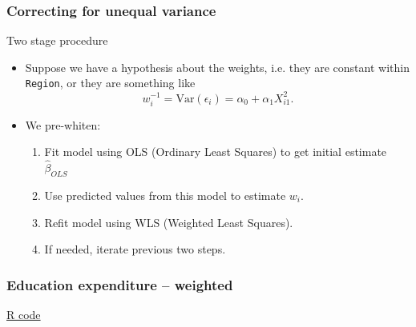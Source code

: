 \documentclass[handout]{beamer}
\begin{document}
   \begin{frame} \frametitle{Correcting for unequal variance}

   \begin{block}
   {Two stage procedure}

   \begin{itemize}


   \item Suppose we have a hypothesis about the weights, i.e.
   they are constant within {\tt Region}, or they are something like
   $$
   w_i^{-1} = \text{Var}(\epsilon_i) =  \alpha_0 + \alpha_1 X_{i1}^2.$$

   \item We pre-whiten:
   \begin{enumerate}
   \item Fit model using OLS (Ordinary Least Squares) to get initial estimate $\widehat{\beta}_{OLS}$

   \item Use predicted values from this model to estimate $w_i$.
   \item Refit model using WLS (Weighted Least Squares).

   \item If needed, iterate previous two steps.
   \end{enumerate}
   \end{itemize}
   \end{block}
   \end{frame}



   \begin{frame}
   \frametitle{Education expenditure -- weighted}
   \begin{center}
   \end{center}
   \href{http://stats191.stanford.edu/transformations.html#education-example}{R code}
   \end{frame}
\end{document}
